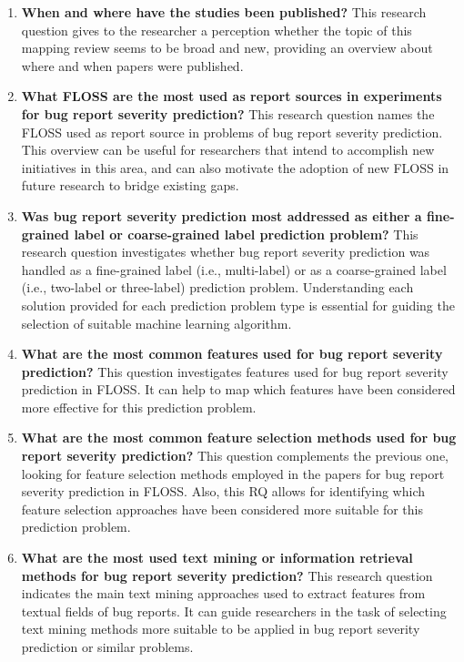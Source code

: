 \begin{enumerate}[label=\textbf{ RQ$_{\arabic*}$}., leftmargin=1.2cm]
  \item \textbf{When and where have the studies been published?} This research question gives to the researcher a perception whether the topic of this mapping review seems to be broad and new, providing an overview about where and when papers were published.
  
  \item \textbf{What FLOSS are the most used as report sources in experiments for bug report severity prediction?} This research question names the FLOSS used as report source in problems of bug report severity prediction. This overview can be useful for researchers that intend to accomplish new initiatives in this area, and can also motivate the adoption of new FLOSS in future research to bridge existing gaps.
  
  \item \textbf{Was bug report severity prediction most addressed as either a fine-grained label  or coarse-grained label prediction problem?} This research question investigates whether bug report severity prediction was handled as a fine-grained label (i.e., multi-label) or as a coarse-grained label (i.e., two-label or three-label) prediction problem. Understanding each solution provided for each prediction problem type is essential for guiding the selection of suitable machine learning algorithm.
  
  \item \textbf{What are the most common features used for bug report severity prediction?} This question investigates features used for bug report severity prediction in FLOSS. It can help to map which features have been considered more effective for this prediction problem.
  
  \item \textbf{What are the most common feature selection methods used for bug report severity prediction?} This question complements the previous one, looking for feature selection methods employed in the papers for bug report severity prediction in FLOSS. Also, this RQ allows for identifying which feature selection approaches have been considered more suitable for this prediction problem.
  
  \item \textbf{What are the most used text mining or information retrieval methods for bug report severity prediction?} This research question indicates the main text mining approaches used to extract features from textual fields of bug reports. It can guide researchers in the task of selecting text mining methods more suitable to be applied in bug report severity prediction or similar problems. 
  

\end{enumerate}
